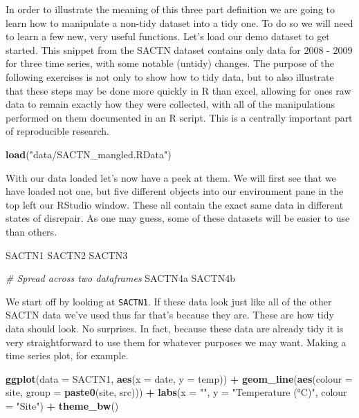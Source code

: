 \documentclass[]{book}
\newenvironment{Shaded}{\begin{snugshade}}{\end{snugshade}}
\newcommand{\KeywordTok}[1]{\textcolor[rgb]{0.13,0.29,0.53}{\textbf{#1}}}
\newcommand{\DataTypeTok}[1]{\textcolor[rgb]{0.13,0.29,0.53}{#1}}
\newcommand{\StringTok}[1]{\textcolor[rgb]{0.31,0.60,0.02}{#1}}
\newcommand{\CommentTok}[1]{\textcolor[rgb]{0.56,0.35,0.01}{\textit{#1}}}
\newcommand{\OperatorTok}[1]{\textcolor[rgb]{0.81,0.36,0.00}{\textbf{#1}}}
\newcommand{\NormalTok}[1]{#1}
\theoremstyle{definition}
\theoremstyle{definition}
\theoremstyle{definition}
\theoremstyle{remark}
\begin{document}
In order to illustrate the meaning of this three part definition we are
going to learn how to manipulate a non-tidy dataset into a tidy one. To
do so we will need to learn a few new, very useful functions. Let's load
our demo dataset to get started. This snippet from the SACTN dataset
contains only data for 2008 - 2009 for three time series, with some
notable (untidy) changes. The purpose of the following exercises is not
only to show how to tidy data, but to also illustrate that these steps
may be done more quickly in R than excel, allowing for ones raw data to
remain exactly how they were collected, with all of the manipulations
performed on them documented in an R script. This is a centrally
important part of reproducible research.

\begin{Shaded}
\begin{Highlighting}[]
\KeywordTok{load}\NormalTok{(}\StringTok{"data/SACTN_mangled.RData"}\NormalTok{)}
\end{Highlighting}
\end{Shaded}

With our data loaded let's now have a peek at them. We will first see
that we have loaded not one, but five different objects into our
environment pane in the top left our RStudio window. These all contain
the exact same data in different states of disrepair. As one may guess,
some of these datasets will be easier to use than others.

\begin{Shaded}
\begin{Highlighting}[]
\NormalTok{SACTN1}
\NormalTok{SACTN2}
\NormalTok{SACTN3}

\CommentTok{# Spread across two dataframes}
\NormalTok{SACTN4a}
\NormalTok{SACTN4b}
\end{Highlighting}
\end{Shaded}

We start off by looking at \texttt{SACTN1}. If these data look just like
all of the other SACTN data we've used thus far that's because they are.
These are how tidy data should look. No surprises. In fact, because
these data are already tidy it is very straightforward to use them for
whatever purposes we may want. Making a time series plot, for example.

\begin{Shaded}
\begin{Highlighting}[]
\KeywordTok{ggplot}\NormalTok{(}\DataTypeTok{data =}\NormalTok{ SACTN1, }\KeywordTok{aes}\NormalTok{(}\DataTypeTok{x =}\NormalTok{ date, }\DataTypeTok{y =}\NormalTok{ temp)) }\OperatorTok{+}
\StringTok{  }\KeywordTok{geom_line}\NormalTok{(}\KeywordTok{aes}\NormalTok{(}\DataTypeTok{colour =}\NormalTok{ site, }\DataTypeTok{group =} \KeywordTok{paste0}\NormalTok{(site, src))) }\OperatorTok{+}
\StringTok{  }\KeywordTok{labs}\NormalTok{(}\DataTypeTok{x =} \StringTok{""}\NormalTok{, }\DataTypeTok{y =} \StringTok{"Temperature (°C)"}\NormalTok{, }\DataTypeTok{colour =} \StringTok{"Site"}\NormalTok{) }\OperatorTok{+}
\StringTok{  }\KeywordTok{theme_bw}\NormalTok{()}
\end{Highlighting}
\end{Shaded}
\end{document}
